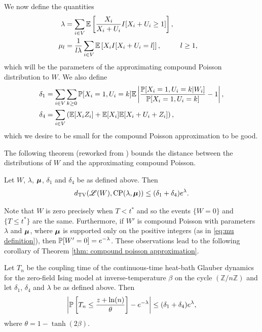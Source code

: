 	We now define the quantities
	\begin{align}
		\lambda &= \sum_{i \in V} \mathbb{E}\left[\frac{X_i}{X_i + U_i} I[ X_i + U_i \geq 1] \right],\\
		\mu_l &= \frac{1}{l \lambda} \sum_{i \in V} \mathbb{E}\left[ X_i I[X_i + U_i = l] \right], && l\geq 1,
		\label{eq:mu definition}
	\end{align}
	which will be the parameters of the approximating compound Poisson distribution to $W$. We also define
	\begin{align}
		\delta_1 &= \sum_{i \in V}  \sum_{k \geq 0} \mathbb{P}[X_i = 1, U_i = k] \mathbb{E} \left|\frac{\mathbb{P}[X_i = 1, U_i = k|W_i]}{\mathbb{P}[X_i = 1, U_i = k]} - 1 \right|, \label{eq:1D delta_1 definition}\\ 
		\delta_4 &= \sum_{i \in V} \left( \mathbb{E}[X_i Z_i] + \mathbb{E}[X_i] \mathbb{E}[X_i + U_i + Z_i] \right), \label{eq:1D delta_4 definition}
	\end{align}
	which we desire to be small for the compound Poisson approximation to be good.

	The following theorem (reworked from \cite{Barbour2001-nh}) bounds the distance between the distributions of $W$ and the approximating compound Poisson.

	\begin{theorem}
	\label{thm: compound poisson approximation}
		Let $W$, $\lambda$, ${\bm{{\mu}}}$, $\delta_1$ and $\delta_4$ be as defined above. Then
		\begin{equation}
			d_{\mathrm{TV}}(\mathscr{L}(W), \mathrm{CP}(\lambda, {\bm{{\mu}}})) \leq (\delta_1 + \delta_4)e^\lambda.
		\end{equation}
	\end{theorem}
	Note that $W$ is zero precisely when $T < t^*$ and so the events $\{W = 0\}$ and $\{T \leq t^*\}$ are the same. Furthermore, if $W'$ is compound Poisson with parameters $\lambda$ and ${\bm{{\mu}}}$, where ${\bm{{\mu}}}$ is supported only on the positive integers (as in \eqref{eq:mu definition}), then $\mathbb{P}[W' = 0] = e^{-\lambda}$. These observations lead to the following corollary of Theorem \ref{thm: compound poisson approximation}.
	\begin{corollary}
	\label{cor:bound distance prob[w=0] and e^-lambda}
	Let $T_n$ be the coupling time of the continuous-time heat-bath Glauber dynamics for the zero-field Ising model at inverse-temperature $\beta$ on the cycle $(\mathbb{Z}/n\mathbb{Z})$ and let $\delta_1$, $\delta_4$ and $\lambda$ be as defined above. Then
		\begin{equation}
			\left|\mathbb{P}\left[T_n \leq \frac{z+\ln(n)}{\theta}\right] - e^{-\lambda}\right| \leq (\delta_1 + \delta_4)e^\lambda,
			\label{eq:bound distance prob[w=0] and e^-lambda}
		\end{equation}
		where $\theta = 1 - \tanh(2\beta)$.
	\end{corollary}	

